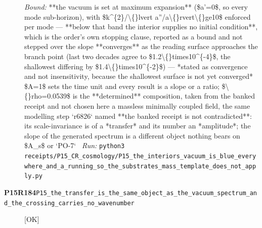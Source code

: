 \begin{description}
 \emph{Bound:}  **the vacuum is set at maximum expansion** (\$a'=0\$, so every mode sub-horizon), with \$k\textasciicircum{}\{2\}/\textbackslash\{\}lvert a''/a\textbackslash\{\}rvert\textbackslash\{\}ge10\$ enforced per mode --- **below that band the interior supplies no initial condition**, which is the order's own stopping clause, reported as a bound and not stepped over  the slope **converges** as the reading surface approaches the branch point (last two decades agree to \$1.2\textbackslash\{\}times10\textasciicircum{}\{-4\}\$, the shallowest differing by \$1.4\textbackslash\{\}times10\textasciicircum{}\{-2\}\$) --- *stated as convergence and not insensitivity, because the shallowest surface is not yet converged*  \$A=1\$ sets the time unit and every result is a slope or a ratio; \$\textbackslash\{\}rho=0.0539\$ is the **determined** composition, taken from the banked receipt and not chosen here  a massless minimally coupled field, the same modelling step `r6826` named  **the banked receipt is not contradicted**: its scale-invariance is of a *transfer* and its number an *amplitude*; the slope of the generated spectrum is a different object  nothing bears on \$A\_s\$ or `PO-7`
\ \emph{Run:} \texttt{python3 receipts/P15\_CR\_cosmology/P15\_the\_interiors\_vacuum\_is\_blue\_everywhere\_and\_a\_running\_so\_the\_substrates\_mass\_template\_does\_not\_apply.py}
\item[\rcptlabel{P15_the_transfer_is_the_same_object_as_the_vacuum_spectrum_and_the_crossing_carries_no_wavenumber}{P15R184}\textbf{P15R184}\quad\texttt{P15\_the\_transfer\_is\_the\_same\_object\_as\_the\_vacuum\_spectrum\_and\_the\_crossing\_carries\_no\_wavenumber}]\hfill\textsf{[OK]}\\

\end{description}
